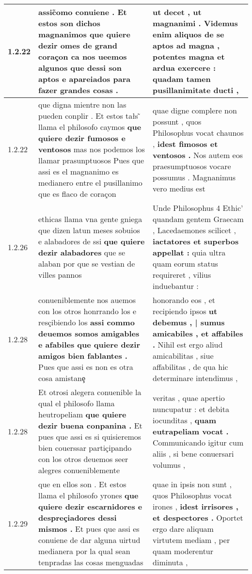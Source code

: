 \begin{tabular}{|p{1cm}|p{6.5cm}|p{6.5cm}|}
1.2.22 & assic̃omo conuiene . Et estos son dichos magnanimos \textbf{ que quiere dezir omes de grand coraçon ca nos ueemos algunos } que dessi son aptos e apareiados para fazer grandes cosas . & ut decet , ut magnanimi . \textbf{ Videmus enim aliquos de se aptos ad magna , } potentes magna et ardua exercere : quadam tamen pusillanimitate ducti , \\\hline
1.2.22 & que digna mientre non las pueden conplir . Et estos tałs ̃ llama el philosofo caymos \textbf{ que quiere dezir fumosos e ventosos } mas nos podemos los llamar prasunptuosos Pues que assi es el magnanimo es medianero entre el pusillanimo que es flaco de coraçon & quae digne complere non possunt , quos Philosophus vocat chaunos , \textbf{ idest fimosos et ventosos . } Nos autem eos praesumptuosos vocare possumus . Magnanimus vero medius est \\\hline
1.2.26 & ethicas llama vna gente gniega que dizen latun meses sobuios e alabadores de ssi \textbf{ que quiere dezir alabadores } que se alaban por que se vestian de villes pannos & Unde Philosophus 4 Ethic’ quandam gentem Graecam , Lacedaemones scilicet , \textbf{ iactatores et superbos appellat : } quia ultra quam eorum status requireret , vilius induebantur : \\\hline
1.2.28 & conueniblemente nos auemos con los otros honrrando los e resçibiendo los \textbf{ assi commo deuemos somos amigables e afabiles que quiere dezir amigos bien fablantes . } Pues que assi es non es otra cosa amistanȩ & honorando eos , et recipiendo ipsos \textbf{ ut debemus , | sumus amicabiles , et affabiles . } Nihil est ergo aliud amicabilitas , siue affabilitas , de qua hic determinare intendimus , \\\hline
1.2.28 & Et otrosi alegera conuenible la qual el philosofo llama heutropeliam \textbf{ que quiere dezir buena conpanina . } Et pues que assi es si quisieremos bien couerssar partiçipando con los otros deuemos seer alegres conueniblemente & veritas , quae apertio nuncupatur : et debita iocunditas , \textbf{ quam eutrapeliam vocat . } Communicando igitur cum aliis , si bene conuersari volumus , \\\hline
1.2.29 & que en ellos son . Et estos llama el philosofo yrones \textbf{ que quiere dezir escarnidores e despreçiadores dessi mismos . } Et pues que assi es conuiene de dar alguna uirtud medianera por la qual sean tenpradas las cosas menguadas & quae in ipsis non sunt , quos Philosophus vocat irones , \textbf{ idest irrisores , et despectores . } Oportet ergo dare aliquam virtutem mediam , per quam moderentur diminuta , \\\hline

\end{tabular}
